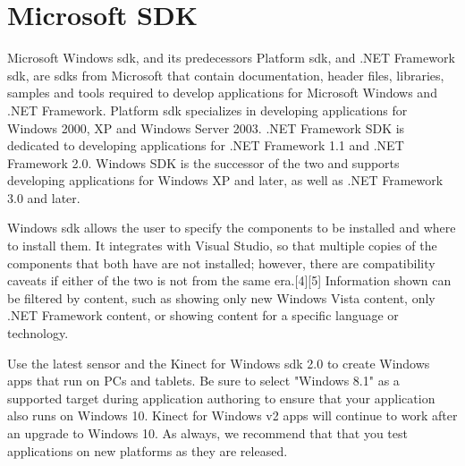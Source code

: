 \section{Microsoft SDK}
\label{sec:microsoftsdk}

Microsoft Windows \gls{sdk}, and its predecessors Platform \gls{sdk}, and .NET Framework \gls{sdk}, are \glspl{sdk} from Microsoft that contain documentation, header files, libraries, samples and tools required to develop applications for Microsoft Windows and .NET Framework. Platform \gls{sdk} specializes in developing applications for Windows 2000, XP and Windows Server 2003. .NET Framework SDK is dedicated to developing applications for .NET Framework 1.1 and .NET Framework 2.0. Windows SDK is the successor of the two and supports developing applications for Windows XP and later, as well as .NET Framework 3.0 and later.

Windows \gls{sdk} allows the user to specify the components to be installed and where to install them. It integrates with Visual Studio, so that multiple copies of the components that both have are not installed; however, there are compatibility caveats if either of the two is not from the same era.[4][5] Information shown can be filtered by content, such as showing only new Windows Vista content, only .NET Framework content, or showing content for a specific language or technology.

Use the latest sensor and the Kinect for Windows \gls{sdk} 2.0 to create Windows apps that run on PCs and tablets. Be sure to select "Windows 8.1" as a supported target during application authoring to ensure that your application also runs on Windows 10. Kinect for Windows v2 apps will continue to work after an upgrade to Windows 10. As always, we recommend that that you test applications on new platforms as they are released.